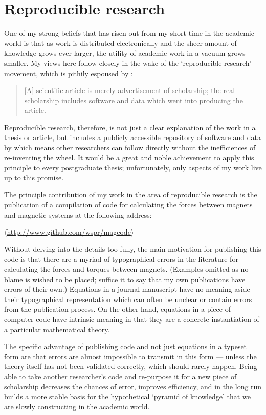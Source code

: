 \chapter{Reproducible research}
\label{repro-research}

One of my strong beliefs that has risen out from my short time in the academic world is that as work is distributed electronically and the sheer amount of knowledge grows ever larger, the utility of academic work in a vacuum grows smaller.
My views here follow closely in the wake of the `reproducible research' movement, which is pithily espoused by \textcite{kovacevic2007-icassp}:
\begin{quote}
\textup [A\textup] scientific article is merely advertisement of scholarship; the real scholarship includes software and data which went into producing the article.
\end{quote}
Reproducible research, therefore, is not just a clear explanation of the work in a thesis or article, but includes a publicly accessible repository of software and data by which means other researchers can follow directly without the inefficiences of re-inventing the wheel.
It would be a great and noble achievement to apply this principle to every postgraduate thesis; unfortunately, only aspects of my work live up to this promise.

The principle contribution of my work in the area of reproducible research is the publication of a compilation of code for calculating the forces between magnets and magnetic systems at the following address:\\
\centerline{$\langle$\url{http://www.github.com/wspr/magcode}$\rangle$}

Without delving into the details too fully, the main motivation for publishing this code is that there are a myriad of typographical errors in the literature for calculating the forces and torques between magnets.
(Examples omitted as no blame is wished to be placed; suffice it to say that my own publications have errors of their own.)
Equations in a journal manuscript have no meaning aside their typographical representation which can often be unclear or contain errors from the publication process.
On the other hand, equations in a piece of computer code have intrinsic meaning in that they are a concrete instantiation of a particular mathematical theory.

The specific advantage of publishing code and not just equations in a typeset form are that errors are almost impossible to transmit in this form — unless the theory itself has not been validated correctly, which should rarely happen.
Being able to take another researcher's code and re-purpose it for a new piece of scholarship decreases the chances of error, improves efficiency, and in the long run builds a more stable basis for the hypothetical `pyramid of knowledge' that we are slowly constructing in the academic world.


